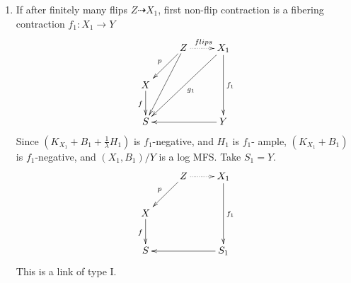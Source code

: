 \documentclass{article}
\begin{document}
\begin{enumerate}[(A)]
\begin{enumerate}[1)]
  $$ \xymatrix{
    &Z\ar[ld]_p\ar@{.>}[r]&Z'\ar[dr]^{q}&\\
    X\ar[d]\ar@{.>}[rrr]^{\psi_1}&&&X_1\ar[d]_{f_1}\\
  S\ar@{=}[rrr]&&&S_1} $$
  This is a link of type II.
\item If after finitely many flips $ Z\dashrightarrow X_1 $, first non-flip contraction is a fibering contraction $ f_1:X_1\to Y  $
  $$ \xymatrix{
    &Z\ar[ld]_p\ar[ldd]\ar@{.>}[r]^{flips}&X_1\ar[lldd]^{g_1}\ar[dd]^{f_1}\\
    X\ar[d]_f&&\\
  S &&Y\ar[ll]}$$
  Since $ (K_{X_1}+B_1+\frac{1}{\lambda}H_1) $ is $ f_1 $-negative, and $ H_1 $ is $ f_1 $- ample, $ (K_{X_1}+B_1) $ is $ f_1 $-negative, and $ (X_1,B_1)/Y $ is a log MFS.  Take $ S_1=Y $.
  $$ \xymatrix{
    &Z\ar[ld]_p\ar@{.>}[r]&X_1\ar[dd]^{f_1}\\
    X\ar[d]_f&&\\
  S &&S_1\ar[ll]}$$
  This is a link of type I.
\end{enumerate}
\end{enumerate}
\end{document}
